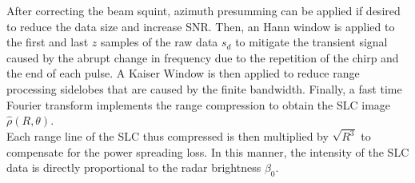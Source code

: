 After correcting the beam squint, azimuth presumming can be applied if desired to reduce the data size and increase SNR. Then, an Hann window is applied to the first and last $z$ samples of the raw data $s_{d}$ to mitigate the transient signal caused by the abrupt change in frequency due to the repetition of the chirp and the end of each pulse. A Kaiser Window is then applied to reduce range processing sidelobes that are caused by the finite bandwidth. Finally, a fast time Fourier transform implements the range compression to obtain the SLC image $\hat{\rho}\left(R, \theta\right)$.
\\ Each range line of the SLC thus compressed is then multiplied by $\sqrt{R^3}$ to compensate for the power spreading loss. In this manner, the intensity of the SLC data is directly proportional to the radar brightness $\beta_{0}$\cite{Raney1994}. 
